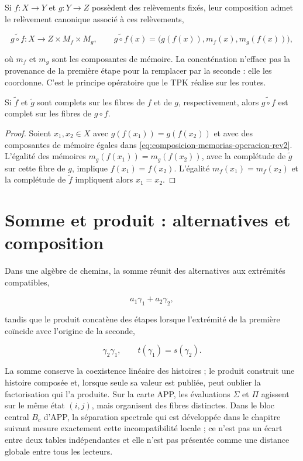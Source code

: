 Si \(f:X\to Y\) et \(g:Y\to Z\) possèdent des relèvements fixés, leur composition
admet le relèvement canonique associé à ces relèvements,

\begin{equation}
 \widetilde{g\circ f}:X\longrightarrow Z\times M_f\times M_g,
 \qquad
 \widetilde{g\circ f}(x)
 =\bigl(g(f(x)),m_f(x),m_g(f(x))\bigr),
 \label{eq:composicion-memorias-operacion-rev2}
\end{equation}

où \(m_f\) et \(m_g\) sont les composantes de mémoire. La concaténation
n'efface pas la provenance de la première étape pour la remplacer par la seconde : elle les
coordonne. C'est le principe opératoire que le TPK réalise sur les routes.

\begin{lemma}
\label{lem:composicion-levantamientos-completos-rev2}
Si \(\widetilde f\) et \(\widetilde g\) sont complets sur les fibres de
\(f\) et de \(g\), respectivement, alors
\(\widetilde{g\circ f}\) est complet sur les fibres de \(g\circ f\).
\end{lemma}

\begin{proof}
Soient \(x_1,x_2\in X\) avec
\(g(f(x_1))=g(f(x_2))\) et avec des composantes de mémoire égales dans
\eqref{eq:composicion-memorias-operacion-rev2}. L'égalité des mémoires
\(m_g(f(x_1))=m_g(f(x_2))\), avec la complétude de
\(\widetilde g\) sur cette fibre de \(g\), implique
\(f(x_1)=f(x_2)\). L'égalité
\(m_f(x_1)=m_f(x_2)\) et la complétude de \(\widetilde f\) impliquent alors
\(x_1=x_2\).
\end{proof}

\section{Somme et produit : alternatives et composition}

Dans une algèbre de chemins, la somme réunit des alternatives aux extrémités
compatibles,

\[
 a_1\gamma_1+a_2\gamma_2,
\]

tandis que le produit concatène des étapes lorsque l'extrémité de la première
coïncide avec l'origine de la seconde,

\[
 \gamma_2\gamma_1,
 \qquad t(\gamma_1)=s(\gamma_2).
\]

La somme conserve la coexistence linéaire des histoires ; le produit construit
une histoire composée et, lorsque seule sa valeur est publiée, peut oublier la
factorisation qui l'a produite. Sur la carte APP, les évaluations
\(\Sigma\) et \(\Pi\) agissent sur le même état \((i,j)\), mais organisent des fibres
distinctes. Dans le bloc central \(B_c\) d'APP, la séparation spectrale qui
est développée dans le chapitre suivant mesure exactement cette incompatibilité
locale ; ce n'est pas un écart entre deux tables indépendantes et elle n'est pas présentée
comme une distance globale entre tous les lecteurs.

